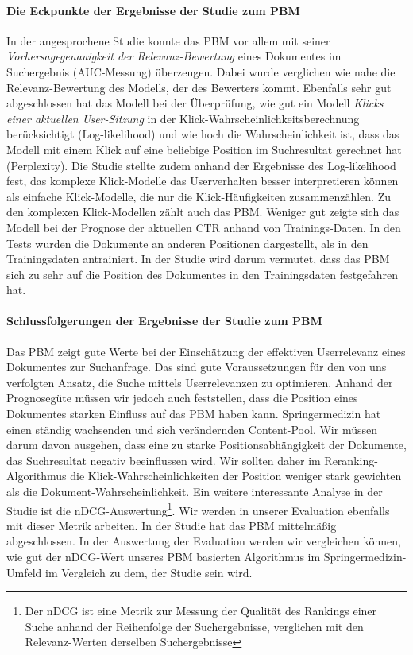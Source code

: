 \paragraph{Die Eckpunkte der Ergebnisse der Studie zum PBM}
In der angesprochene Studie \cite{pbm} konnte das PBM vor allem mit seiner \textit{Vorhersagegenauigkeit der Relevanz-Bewertung} eines Dokumentes im Suchergebnis (AUC-Messung) überzeugen. Dabei wurde verglichen wie nahe die Relevanz-Bewertung des Modells, der des Bewerters kommt. Ebenfalls sehr gut abgeschlossen hat das Modell bei der Überprüfung, wie gut ein Modell \textit{Klicks einer aktuellen User-Sitzung} in der Klick-Wahrscheinlichkeitsberechnung berücksichtigt (Log-likelihood) und wie hoch die Wahrscheinlichkeit ist, dass das Modell mit einem Klick auf eine beliebige Position im Suchresultat gerechnet hat (Perplexity). Die Studie stellte zudem anhand der Ergebnisse des Log-likelihood fest, das komplexe Klick-Modelle das Userverhalten besser interpretieren können als einfache Klick-Modelle, die nur die Klick-Häufigkeiten zusammenzählen. Zu den komplexen Klick-Modellen zählt auch das PBM. Weniger gut zeigte sich das Modell bei der Prognose der aktuellen CTR anhand von Trainings-Daten. In den Tests wurden die Dokumente an anderen Positionen dargestellt, als in den Trainingsdaten antrainiert. In der Studie wird darum vermutet, dass das PBM sich zu sehr auf die Position des Dokumentes in den Trainingsdaten festgefahren hat.

\paragraph{Schlussfolgerungen der Ergebnisse der Studie zum PBM}
Das PBM zeigt gute Werte bei der Einschätzung der effektiven Userrelevanz eines Dokumentes zur Suchanfrage. Das sind gute Voraussetzungen für den von uns verfolgten Ansatz, die Suche mittels Userrelevanzen zu optimieren. Anhand der Prognosegüte müssen wir jedoch auch feststellen, dass die Position eines Dokumentes starken Einfluss auf das PBM haben kann. Springermedizin hat einen ständig wachsenden und sich verändernden Content-Pool. Wir müssen darum davon ausgehen, dass eine zu starke Positionsabhängigkeit der Dokumente, das Suchresultat negativ beeinflussen wird. Wir sollten daher im Reranking-Algorithmus die Klick-Wahrscheinlichkeiten der Position weniger stark gewichten als die Dokument-Wahrscheinlichkeit. Ein weitere interessante Analyse in der Studie ist die nDCG-Auswertung\footnote{Der nDCG ist eine Metrik zur Messung der Qualität des Rankings einer Suche anhand der Reihenfolge der Suchergebnisse, verglichen mit den Relevanz-Werten derselben Suchergebnisse}. Wir werden in unserer Evaluation ebenfalls mit dieser Metrik arbeiten. In der Studie hat das PBM mittelmäßig abgeschlossen. In der Auswertung der Evaluation werden wir vergleichen können, wie gut der nDCG-Wert unseres PBM basierten Algorithmus im Springermedizin-Umfeld im Vergleich zu dem, der Studie sein wird.

